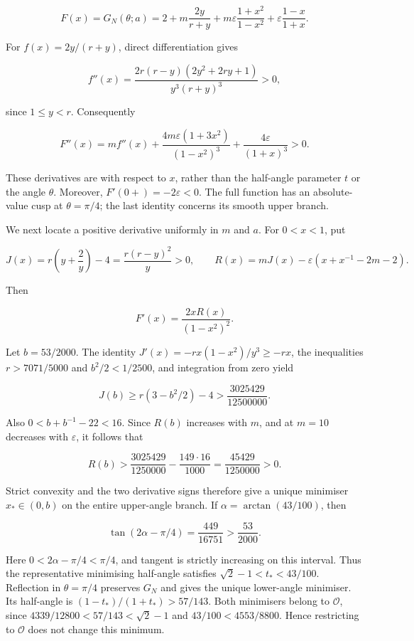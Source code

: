 \documentclass[
  11pt,
  a4paper,
]{article}
\begin{document}
\[
F(x)=G_N(\theta;a)
=2+m\frac{2y}{r+y}
 +m\varepsilon\frac{1+x^2}{1-x^2}
 +\varepsilon\frac{1-x}{1+x}.
\]

For \(f(x)=2y/(r+y)\), direct differentiation gives

\[
f''(x)=\frac{2r(r-y)(2y^2+2ry+1)}{y^3(r+y)^3}>0,
\]

since \(1\le y<r\). Consequently

\[
F''(x)=m f''(x)
 +\frac{4m\varepsilon(1+3x^2)}{(1-x^2)^3}
 +\frac{4\varepsilon}{(1+x)^3}>0.
\]

These derivatives are with respect to \(x\), rather than the half-angle
parameter \(t\) or the angle \(\theta\). Moreover, \(F'(0+)=-2\varepsilon<0\).
The full function has an absolute-value cusp at \(\theta=\pi/4\); the last
identity concerns its smooth upper branch.

We next locate a positive derivative uniformly in \(m\) and \(a\). For \(0<x<1\),
put

\[
J(x)=r\left(y+\frac2y\right)-4
     =\frac{r(r-y)^2}{y}>0,
\qquad
R(x)=mJ(x)-\varepsilon(x+x^{-1}-2m-2).
\]

Then

\[
F'(x)=\frac{2xR(x)}{(1-x^2)^2}.
\]

Let \(b=53/2000\). The identity \(J'(x)=-rx(1-x^2)/y^3\ge-rx\),
the inequalities \(r>7071/5000\) and \(b^2/2<1/2500\), and integration from
zero yield

\[
J(b)\ge r(3-b^2/2)-4>\frac{3025429}{12500000}.
\]

Also \(0<b+b^{-1}-22<16\). Since \(R(b)\) increases with \(m\), and at \(m=10\)
decreases with \(\varepsilon\), it follows that

\[
R(b)>\frac{3025429}{1250000}-\frac{149\cdot16}{1000}
=\frac{45429}{1250000}>0.
\]

Strict convexity and the two derivative signs therefore give a unique
minimiser \(x_*\in(0,b)\) on the entire upper-angle branch. If
\(\alpha=\arctan(43/100)\), then

\[
\tan(2\alpha-\pi/4)=\frac{449}{16751}>\frac{53}{2000}.
\]

Here \(0<2\alpha-\pi/4<\pi/4\), and tangent is strictly increasing on this interval. Thus the representative
minimising half-angle satisfies
\(\sqrt2-1<t_*<43/100\). Reflection in \(\theta=\pi/4\) preserves \(G_N\) and
gives the unique lower-angle minimiser. Its half-angle is
\((1-t_*)/(1+t_*)>57/143\). Both minimisers belong to \(\mathcal O\), since
\(4339/12800<57/143<\sqrt2-1\) and \(43/100<4553/8800\).
Hence restricting to \(\mathcal O\) does not change this minimum.
\end{document}
